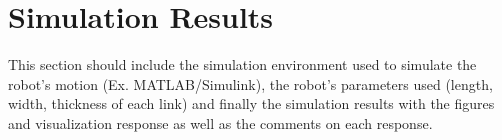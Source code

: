 \section{Simulation Results}\label{sec4}
This section should include the simulation environment used to simulate the robot’s motion (Ex. MATLAB/Simulink), the robot’s parameters used (length, width, thickness of each link) and finally the simulation results with the figures and visualization response as well as the comments on each response.
